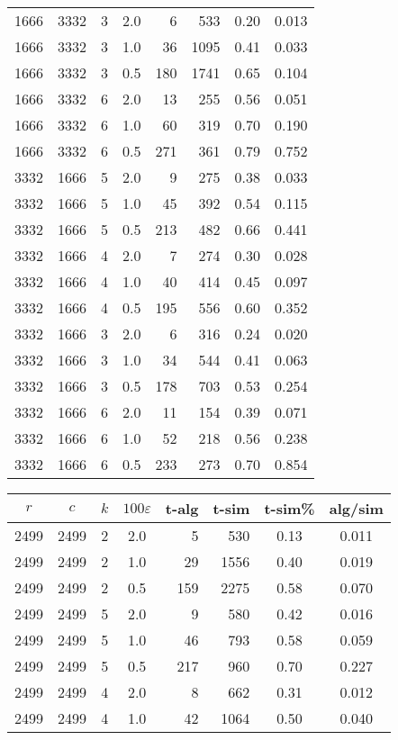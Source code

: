 \documentclass[11pt]{svjour3} \usepackage{fullpage}
\newcommand{\eps}{\varepsilon}
\begin{document}
{\begin{tabular}[t]{@{}|c@{~~}c@{~~}c@{~}c@{~}r@{~}r@{~}c@{~}c|}
\\ 1666 & 3332 & 3 & 2.0 & 6 & 533 & 0.20 & 0.013
\\ 1666 & 3332 & 3 & 1.0 & 36 & 1095 & 0.41 & 0.033
\\ 1666 & 3332 & 3 & 0.5 & 180 & 1741 & 0.65 & 0.104
\\ 1666 & 3332 & 6 & 2.0 & 13 & 255 & 0.56 & 0.051
\\ 1666 & 3332 & 6 & 1.0 & 60 & 319 & 0.70 & 0.190
\\ 1666 & 3332 & 6 & 0.5 & 271 & 361 & 0.79 & 0.752
\\ 3332 & 1666 & 5 & 2.0 & 9 & 275 & 0.38 & 0.033
\\ 3332 & 1666 & 5 & 1.0 & 45 & 392 & 0.54 & 0.115
\\ 3332 & 1666 & 5 & 0.5 & 213 & 482 & 0.66 & 0.441
\\ 3332 & 1666 & 4 & 2.0 & 7 & 274 & 0.30 & 0.028
\\ 3332 & 1666 & 4 & 1.0 & 40 & 414 & 0.45 & 0.097
\\ 3332 & 1666 & 4 & 0.5 & 195 & 556 & 0.60 & 0.352
\\ 3332 & 1666 & 3 & 2.0 & 6 & 316 & 0.24 & 0.020
\\ 3332 & 1666 & 3 & 1.0 & 34 & 544 & 0.41 & 0.063
\\ 3332 & 1666 & 3 & 0.5 & 178 & 703 & 0.53 & 0.254
\\ 3332 & 1666 & 6 & 2.0 & 11 & 154 & 0.39 & 0.071
\\ 3332 & 1666 & 6 & 1.0 & 52 & 218 & 0.56 & 0.238
\\ 3332 & 1666 & 6 & 0.5 & 233 & 273 & 0.70 & 0.854
\\ \hline
\end{tabular}
\begin{tabular}[t]{@{}|c@{~~}c@{~~}c@{~}c@{~}r@{~}r@{~}c@{~}c|} \hline
$r$	& $c$	& $k$	& $100\eps$	& t-alg	& t-sim	& t-sim\% & alg/sim \\ \hline
 2499 & 2499 & 2 & 2.0 & 5 & 530 & 0.13 & 0.011
\\ 2499 & 2499 & 2 & 1.0 & 29 & 1556 & 0.40 & 0.019
\\ 2499 & 2499 & 2 & 0.5 & 159 & 2275 & 0.58 & 0.070
\\ 2499 & 2499 & 5 & 2.0 & 9 & 580 & 0.42 & 0.016
\\ 2499 & 2499 & 5 & 1.0 & 46 & 793 & 0.58 & 0.059
\\ 2499 & 2499 & 5 & 0.5 & 217 & 960 & 0.70 & 0.227
\\ 2499 & 2499 & 4 & 2.0 & 8 & 662 & 0.31 & 0.012
\\ 2499 & 2499 & 4 & 1.0 & 42 & 1064 & 0.50 & 0.040

\end{tabular}}
\end{document}
